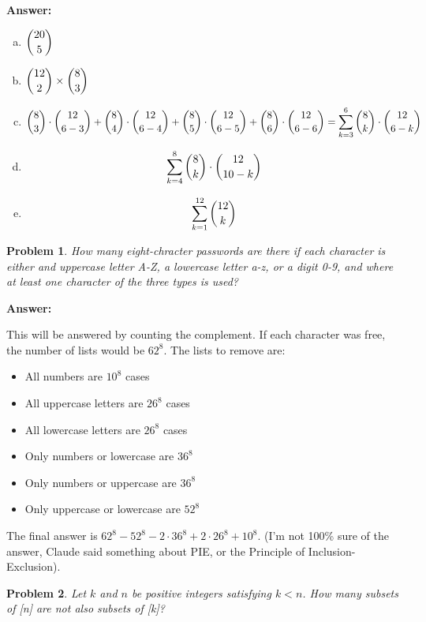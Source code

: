 \documentclass{article}
\theoremstyle{plain}
\newtheorem{problem}{Problem}
\begin{document}
\textbf{Answer:}
\begin{enumerate}[(a)]
    \item $\dbinom{20}{5}$
    \item $\dbinom{12}{2} \times \dbinom{8}{3}$
    \item \begin{equation*}
        \dbinom{8}{3} \cdot \dbinom{12}{6-3} + \dbinom{8}{4} \cdot \dbinom{12}{6-4} + \dbinom{8}{5} \cdot \dbinom{12}{6-5} + \dbinom{8}{6} \cdot \dbinom{12}{6-6} = \sum_{k=3}^{6}\dbinom{8}{k} \cdot \dbinom{12}{6-k}
    \end{equation*}
    \item \begin{equation*}
        \sum_{k=4}^{8}\dbinom{8}{k} \cdot \dbinom{12}{10-k}
    \end{equation*}
    \item \begin{equation*}
        \sum_{k=1}^{12}\dbinom{12}{k}
    \end{equation*}
\end{enumerate}

\begin{problem} %
How many eight-chracter passwords are there if each character is either and uppercase letter A-Z, a lowercase letter a-z, or a digit 0-9, and where at least one character of the three types is used?
\end{problem}

\textbf{Answer:}\smallskip

This will be answered by counting the complement. If each character was free, the number of lists would be $62^8$. The lists to remove are:
\begin{itemize}
    \item All numbers are $10^8$ cases
    \item All uppercase letters are $26^8$ cases
    \item All lowercase letters are $26^8$ cases
    \item Only numbers or lowercase are $36^8$
    \item Only numbers or uppercase are $36^8$
    \item Only uppercase or lowercase are $52^8$
\end{itemize}
The final answer is $62^8 - 52^8 - 2 \cdot 36^8 + 2 \cdot 26^8 + 10^8$. (I'm not 100\% sure of the answer, Claude said something about PIE, or the Principle of Inclusion-Exclusion).

\setcounter{problem}{7}
\begin{problem} %
Let $k$ and $n$ be positive integers satisfying $k < n$. How many subsets of [n] are not also subsets of [k]?
\end{problem}
\end{document}
